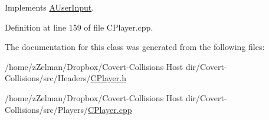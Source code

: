 Implements \hyperlink{classAUserInput_a570f71dde4825c3e9bdcf6b58857f514}{A\-User\-Input}.



Definition at line 159 of file C\-Player.\-cpp.



The documentation for this class was generated from the following files\-:\begin{DoxyCompactItemize}
\item 
/home/z\-Zelman/\-Dropbox/\-Covert-\/\-Collisions Host dir/\-Covert-\/\-Collisions/src/\-Headers/\hyperlink{CPlayer_8h}{C\-Player.\-h}\item 
/home/z\-Zelman/\-Dropbox/\-Covert-\/\-Collisions Host dir/\-Covert-\/\-Collisions/src/\-Players/\hyperlink{CPlayer_8cpp}{C\-Player.\-cpp}\end{DoxyCompactItemize}
